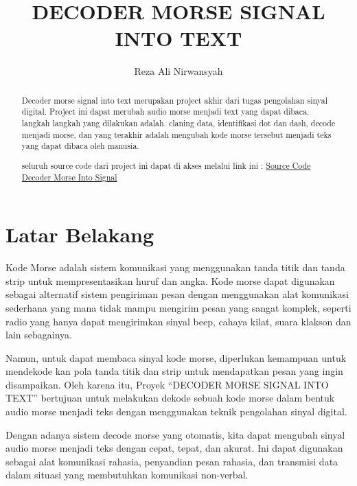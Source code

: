 \documentclass[]{article}
\title{DECODER MORSE SIGNAL INTO TEXT}
\author{Reza Ali Nirwansyah}
\begin{document}
\maketitle

\begin{abstract}
Decoder morse signal into text merupakan project akhir dari tugas pengolahan sinyal digital. Project ini dapat merubah audio morse menjadi text yang dapat dibaca. langkah langkah yang dilakukan adalah. claning data, identifikasi dot dan dash, decode menjadi morse, dan yang terakhir adalah mengubah kode morse tersebut menjadi teks yang dapat dibaca oleh manusia.

seluruh source code dari project ini dapat di akses melalui link ini : \href{https://github.com/keriz21/morse_decoder}{Source Code Decoder Morse Into Signal}
\end{abstract}

\section{Latar Belakang}

Kode Morse adalah sistem komunikasi yang menggunakan tanda titik dan tanda strip untuk mempresentasikan huruf dan angka. Kode morse dapat digunakan sebagai alternatif sistem pengiriman pesan dengan menggunakan alat komunikasi sederhana yang mana tidak mampu mengirim pesan yang sangat komplek, seperti radio yang hanya dapat mengirimkan sinyal beep, cahaya kilat, suara klakson dan lain sebagainya.

Namun, untuk dapat membaca sinyal kode morse, diperlukan kemampuan untuk mendekode kan pola tanda titik dan strip untuk mendapatkan pesan yang ingin disampaikan. Oleh karena itu, Proyek “DECODER MORSE SIGNAL INTO TEXT” bertujuan untuk melakukan dekode sebuah kode morse dalam bentuk audio morse menjadi teks dengan menggunakan teknik pengolahan sinyal digital.

Dengan adanya sistem decode morse yang otomatis, kita dapat mengubah sinyal audio morse menjadi teks dengan cepat, tepat, dan akurat. Ini dapat digunakan sebagai alat komunikasi rahasia, penyandian pesan rahasia, dan transmisi data dalam situasi yang membutuhkan komunikasi non-verbal.
\end{document}
